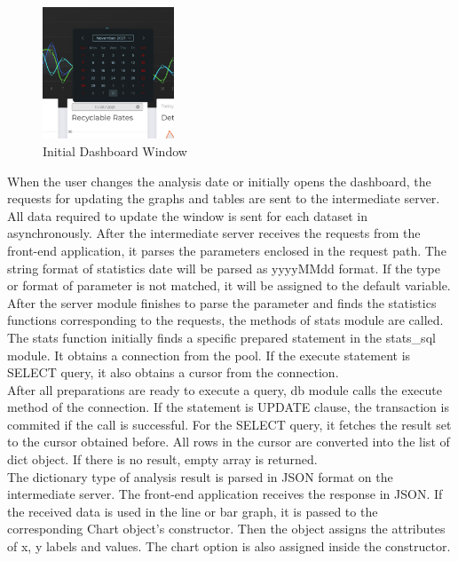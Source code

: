 \documentclass[conference]{IEEEtran}
\begin{document}
\begin{figure}[h]
    \centering
    \includegraphics[width=0.35\textwidth]{images/dashboard_change_date.eps}
    \caption{Initial Dashboard Window}
\end{figure}

When the user changes the analysis date or initially opens the dashboard, the requests for updating the graphs and tables are sent to the intermediate server. All data required to update the window is sent for each dataset in asynchronously. After the intermediate server receives the requests from the front-end application, it parses the parameters enclosed in the request path. The string format of statistics date will be parsed as yyyyMMdd format. If the type or format of parameter is not matched, it will be assigned to the default variable.\\

After the server module finishes to parse the parameter and finds the statistics functions corresponding to the requests, the methods of stats module are called. The stats function initially finds a specific prepared statement in the stats\_sql module. It obtains a connection from the pool. If the execute statement is SELECT query, it also obtains a cursor from the connection.\\

After all preparations are ready to execute a query, db module calls the execute method of the connection. If the statement is UPDATE clause, the transaction is commited if the call is successful. For the SELECT query, it fetches the result set to the cursor obtained before. All rows in the cursor are converted into the list of dict object. If there is no result, empty array is returned.\\

The dictionary type of analysis result is parsed in JSON format on the intermediate server. The front-end application receives the response in JSON. If the received data is used in the line or bar graph, it is passed to the corresponding Chart object's constructor. Then the object assigns the attributes of x, y labels and values. The chart option is also assigned inside the constructor.\\
\end{document}
